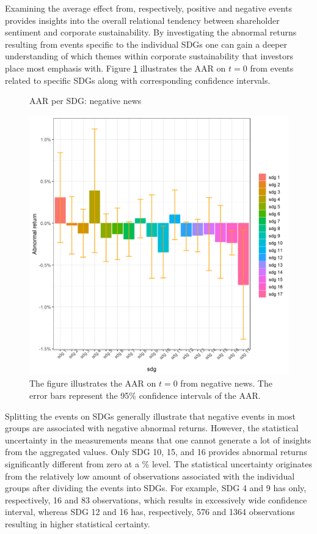 Examining the average effect from, respectively, positive and negative events provides insights into the overall relational tendency between shareholder sentiment and corporate sustainability. By investigating the abnormal returns resulting from events specific to the individual SDGs one can gain a deeper understanding of which themes within corporate sustainability that investors place most emphasis with. Figure \ref{fig:ST_neg_bar} illustrates the AAR on $t=0$ from events related to specific SDGs along with corresponding confidence intervals. 

\begin{figure} [H]
    \centering
    \caption{AAR per SDG: negative news}
    \includegraphics[scale=0.6]{Projekt/1.Figures analysis/ST_negative_sdg_bar.png}
    \caption*{\footnotesize The figure illustrates the AAR on $t = 0$ from negative news. The error bars represent the 95\% confidence intervals of the AAR.}
    \label{fig:ST_neg_bar}
\end{figure}

Splitting the events on SDGs generally illustrate that negative events in most groups are associated with negative abnormal returns. However, the statistical uncertainty in the measurements means that one cannot generate a lot of insights from the aggregated values. Only SDG 10, 15, and 16 provides abnormal returns significantly different from zero at a \% level. The statistical uncertainty originates from the relatively low amount of observations associated with the individual groups after dividing the events into SDGs. For example, SDG 4 and 9 has only, respectively, 16 and 83 observations, which results in excessively wide confidence interval, whereas SDG 12 and 16 has, respectively, 576 and 1364 observations resulting in higher statistical certainty.   


